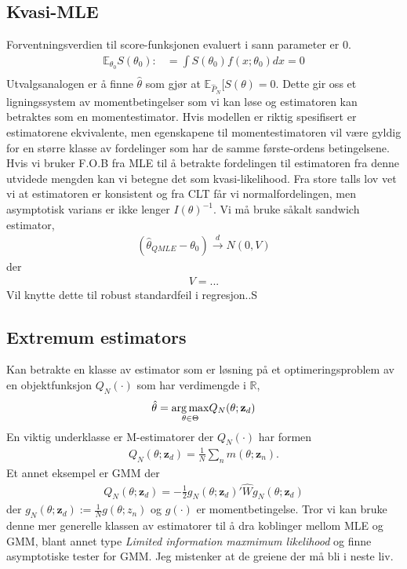 \subsection{Kvasi-MLE}
Forventningsverdien til score-funksjonen evaluert i sann parameter er 0.
\begin{align}
\mathbb{E}_{\theta_0}S(\theta_0) :&= \int S(\theta_0)f(x;\theta_0)dx =0\\
\end{align}
Utvalgsanalogen er å finne $\hat{\theta}$ som gjør at $\mathbb{E}_{\hat{P}_N}[S(\theta)=0$. Dette gir oss et ligningssystem av momentbetingelser som vi kan løse og estimatoren kan betraktes som en momentestimator. Hvis modellen er riktig spesifisert er estimatorene ekvivalente, men egenskapene til momentestimatoren vil være gyldig for en større klasse av fordelinger som har de samme første-ordens betingelsene. Hvis vi bruker F.O.B fra MLE til å betrakte fordelingen til estimatoren fra denne utvidede mengden kan vi betegne det som kvasi-likelihood. Fra store talls lov vet vi at estimatoren er konsistent og fra CLT får vi normalfordelingen, men asymptotisk varians er ikke lenger $I(\theta)^{-1}$. Vi må bruke såkalt sandwich estimator,
\begin{align}
(\hat{\theta}_{QMLE}-\theta_0) \overset{d}{\to} N(0,V)
\end{align}
der
\begin{align}
V = ...
\end{align}
Vil knytte dette til robust standardfeil i regresjon..S
\subsection{Extremum estimators}
Kan betrakte en klasse av estimator som er løsning på et optimeringsproblem av en objektfunksjon $Q_N(\cdot)$ som har verdimengde i $\mathbb{R}$,
\begin{align}
\hat{\theta} = \underset{\theta\in\Theta}{\operatorname*{arg\,max}} Q_N(\theta;\mathbf{z}_d)
\end{align}
En viktig underklasse er M-estimatorer der $Q_N(\cdot)$ har formen
\begin{align}
Q_N(\theta;\mathbf{z}_d) = \frac{1}{N}\sum_n m(\theta;\mathbf{z}_n).
\end{align}
Et annet eksempel er GMM der 
\begin{align}
Q_N(\theta;\mathbf{z}_d) = -\frac{1}{2}g_N(\theta;\mathbf{z}_d)'\hat{W}g_N(\theta;\mathbf{z}_d)
\end{align}
der $g_N(\theta;\mathbf{z}_d) := \frac{1}{N}g(\theta;z_n)$ og $g(\cdot)$ er momentbetingelse. Tror vi kan bruke denne mer generelle klassen av estimatorer til å dra koblinger mellom MLE og GMM, blant annet type \textit{Limited information maxmimum likelihood} og finne asymptotiske tester for GMM. Jeg mistenker at de greiene der må bli i neste liv.